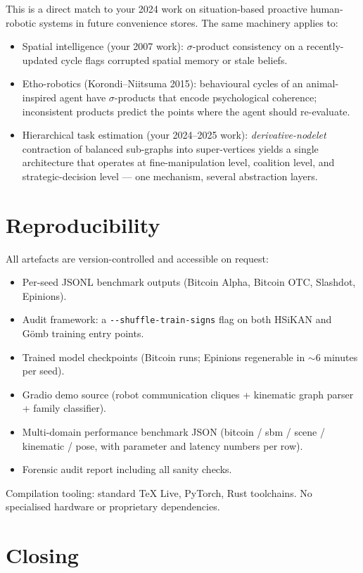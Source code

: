 \documentclass[11pt,a4paper]{article}
\newcommand{\sig}{\ensuremath{\sigma}}
\begin{document}
This is a direct match to your 2024 work on situation-based
proactive human-robotic systems in future convenience stores. The
same machinery applies to:
\begin{itemize}
  \item Spatial intelligence (your 2007 work): $\sig$-product
    consistency on a recently-updated cycle flags corrupted spatial
    memory or stale beliefs.
  \item Etho-robotics (Korondi--Niitsuma 2015): behavioural cycles
    of an animal-inspired agent have $\sig$-products that encode
    psychological coherence; inconsistent products predict the
    points where the agent should re-evaluate.
  \item Hierarchical task estimation (your 2024--2025 work):
    \emph{derivative-nodelet} contraction of balanced sub-graphs
    into super-vertices yields a single architecture that operates
    at fine-manipulation level, coalition level, and
    strategic-decision level --- one mechanism, several abstraction
    layers.
\end{itemize}

\section{Reproducibility}

All artefacts are version-controlled and accessible on request:
\begin{itemize}
  \item Per-seed JSONL benchmark outputs (Bitcoin Alpha, Bitcoin
    OTC, Slashdot, Epinions).
  \item Audit framework: a \verb|--shuffle-train-signs| flag on
    both HSiKAN and G\"omb training entry points.
  \item Trained model checkpoints (Bitcoin runs; Epinions
    regenerable in $\sim$6 minutes per seed).
  \item Gradio demo source (robot communication cliques + kinematic
    graph parser + family classifier).
  \item Multi-domain performance benchmark JSON
    (bitcoin / sbm / scene / kinematic / pose, with parameter and
    latency numbers per row).
  \item Forensic audit report including all sanity checks.
\end{itemize}
Compilation tooling: standard TeX Live, PyTorch, Rust toolchains.
No specialised hardware or proprietary dependencies.

\section{Closing}
\end{document}
